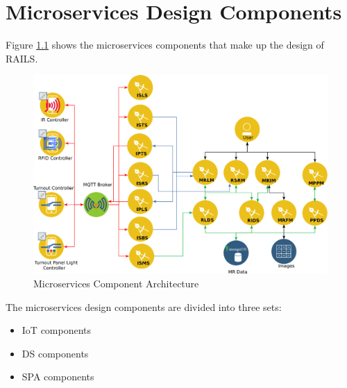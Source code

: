 \chapter{Microservices Design Components}
Figure \ref{fig:microarchitecture} shows the microservices components that make up the design of \ac{RAILS}.

\begin{figure}[H]
	\centering
		\includegraphics[scale=0.7]{design.eps}
	\caption{Microservices Component Architecture}
	\label{fig:microarchitecture}
\end{figure}

The microservices design components are divided into three sets:
\begin{itemize}
  \item \ac{IoT} components
  \item \ac{DS} components
  \item \ac{SPA} components
\end{itemize}

